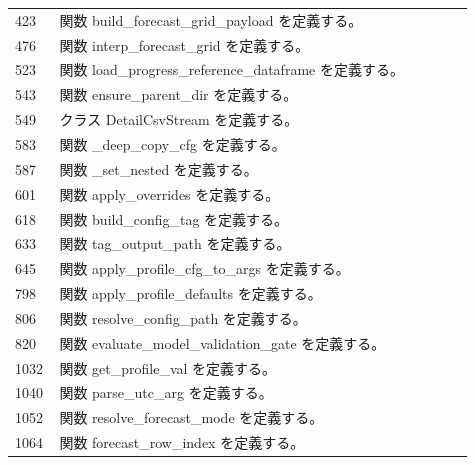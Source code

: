 \documentclass[a4paper,11pt]{article}
\begin{document}
\begin{longtable}{p{0.07\linewidth} p{0.84\linewidth}}
423 & 関数 build\_forecast\_grid\_payload を定義する。 \\
476 & 関数 interp\_forecast\_grid を定義する。 \\
523 & 関数 load\_progress\_reference\_dataframe を定義する。 \\
543 & 関数 ensure\_parent\_dir を定義する。 \\
549 & クラス DetailCsvStream を定義する。 \\
583 & 関数 \_deep\_copy\_cfg を定義する。 \\
587 & 関数 \_set\_nested を定義する。 \\
601 & 関数 apply\_overrides を定義する。 \\
618 & 関数 build\_config\_tag を定義する。 \\
633 & 関数 tag\_output\_path を定義する。 \\
645 & 関数 apply\_profile\_cfg\_to\_args を定義する。 \\
798 & 関数 apply\_profile\_defaults を定義する。 \\
806 & 関数 resolve\_config\_path を定義する。 \\
820 & 関数 evaluate\_model\_validation\_gate を定義する。 \\
1032 & 関数 get\_profile\_val を定義する。 \\
1040 & 関数 parse\_utc\_arg を定義する。 \\
1052 & 関数 resolve\_forecast\_mode を定義する。 \\
1064 & 関数 forecast\_row\_index を定義する。 \\
            \bottomrule
            \end{longtable}
\end{document}
